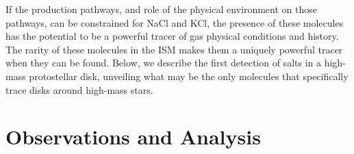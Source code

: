 \documentclass[twocolumn]{aastex62}
\newcommand{\sourcei}{SrcI\xspace}
\newcommand{\bam}[1]{\textcolor{green!65!black}{\textbf{[BAM: #1]}}}
\newcommand{\rlp}[1]{\textcolor{red!65!black}{\textbf{[RLP: #1]}}}
\newcommand{\ag}[1]{\textcolor{red!65!black}{\textbf{[AG: #1]}}}
\begin{document}
If the production pathways, and role of the physical environment on those
pathways, can be constrained for NaCl and KCl, the presence of these molecules
has the potential to be a powerful tracer of gas physical conditions and
history.  The rarity of these molecules in the ISM makes them a uniquely
powerful tracer when they can be found.  Below, we describe the first
detection of salts in a high-mass protostellar disk, unveiling what may
be the only molecules that specifically trace disks around high-mass stars.





\section{Observations and Analysis}
\label{sec:observations}

\end{document}
